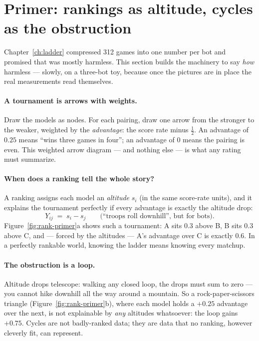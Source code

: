 
\section{Primer: rankings as altitude, cycles as the obstruction}
\label{sec:rank-primer}

Chapter~\ref{ch:ladder} compressed 312 games into one number per bot and
promised that was mostly harmless. This section builds the machinery to say
\emph{how} harmless --- slowly, on a three-bot toy, because once the
pictures are in place the real measurements read themselves.

\paragraph{A tournament is arrows with weights.} Draw the models as nodes.
For each pairing, draw one arrow from the stronger to the weaker, weighted
by the \emph{advantage}: the score rate minus $\tfrac12$. An advantage of
$0.25$ means ``wins three games in four''; an advantage of $0$ means the
pairing is even. This weighted arrow diagram --- and nothing else --- is
what any rating must summarize.

\paragraph{When does a ranking tell the whole story?} A ranking assigns
each model an \emph{altitude} $s_i$ (in the same score-rate units), and it
explains the tournament perfectly if every advantage is exactly the
altitude drop:
\[
  Y_{ij} \;=\; s_i - s_j
  \qquad\text{(``troops roll downhill'', but for bots).}
\]
Figure~\ref{fig:rank-primer}a shows such a tournament: A sits $0.3$ above
B, B sits $0.3$ above C, and --- forced by the altitudes --- A's advantage
over C is exactly $0.6$. In a perfectly rankable world, knowing the ladder
means knowing every matchup.

\paragraph{The obstruction is a loop.} Altitude drops telescope: walking
any closed loop, the drops must sum to zero --- you cannot hike downhill
all the way around a mountain. So a rock-paper-scissors triangle
(Figure~\ref{fig:rank-primer}b), where each model holds a $+0.25$ advantage
over the next, is not explainable by \emph{any} altitudes whatsoever: the
loop gains $+0.75$. Cycles are not badly-ranked data; they are data that no
ranking, however cleverly fit, can represent.

